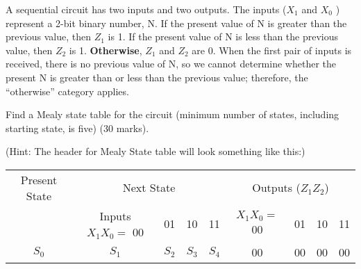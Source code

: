 \begin{prob}
  A sequential circuit has two inputs and two outputs. The inputs ($X_1$ and $X_0$ ) represent a 2-bit binary number, N. If the present value of N is greater than the previous value, then $Z_1$ is 1. If the present value of N is less than the previous value, then $Z_2$ is 1. \textbf{Otherwise}, $Z_1$ and $Z_2$ are 0. When the first pair of inputs is received, there is no previous value of N, so we cannot determine whether the present N is greater than or less than the previous value; therefore, the “otherwise” category applies.

Find a Mealy state table for the circuit (minimum number of states, including starting state, is five) (30 marks).
\label{p:fsm}
\end{prob}
(Hint: The header for Mealy State table will look something like this:)\\
\begin{tabular}{c|c|c|c|c|c|c|c|c}
  \toprule
  Present State & \multicolumn{4}{c|}{ Next State} & \multicolumn{4}{c}{Outputs ($Z_1 Z_2$)} \\
                & Inputs $X_1X_0=$ 00 & 01 & 10 & 11 & $X_1X_0=$ 00 & 01 & 10 & 11 \\
  \midrule
  $S_0$  & $S_1$ & $S_2$ & $S_3$ & $S_4$ & 00 & 00 & 00 & 00 \\
\end{tabular}

